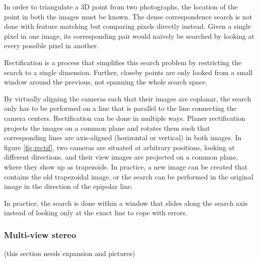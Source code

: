 
In order to triangulate a 3D point from two photographs, the location of the point in both the images must be known.
The dense correspondence search is not done with feature matching but comparing pixels directly instead.
Given a single pixel in one image, its corresponding pair would naively be searched by looking at every possible pixel in another.

Rectification is a process that simplifies this search problem by restricting the search to a single dimension.
Further, closeby points are only looked from a small window around the previous, not spanning the whole search space.

By virtually aligning the cameras such that their images are coplanar, the search only has to be performed on a line that is parallel to the line connecting the camera centers.
Rectification can be done in multiple ways.
Planer rectification projects the images on a common plane and rotates them such that corresponding lines are axis-aligned (horizontal or vertical) in both images. \cite{hartley03multiview}
In figure \ref{fig:rectif}, two cameras are situated at arbitrary positions, looking at different directions, and their view images are projected on a common plane, where they show up as trapezoids.
In practice, a new image can be created that contains the old trapezoidal image, or the search can be performed in the original image in the direction of the epipolar line.

In practice, the search is done within a window that slides along the search axis instead of looking only at the exact line to cope with errors.





\subsubsection{Multi-view stereo} %

(this section needs expansion and pictures)


